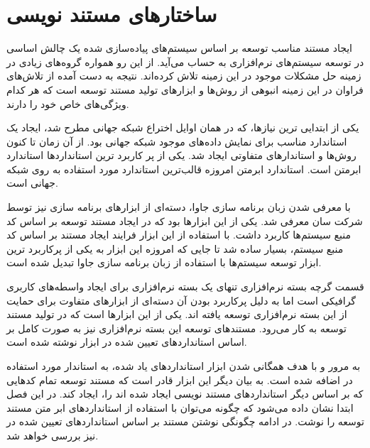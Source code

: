 
\chapter{ساختارهای مستند نویسی}

ایجاد مستند مناسب توسعه بر اساس سیستم‌های پیاده‌سازی شده یک چالش اساسی در توسعه
سیستم‌های نرم‌افزاری به حساب می‌آید. از این رو همواره گروه‌های زیادی در زمینه حل
مشکلات موجود در این زمینه تلاش کرده‌اند. نتیجه به دست آمده از تلاش‌های فراوان در
این زمینه انبوهی از روش‌ها و ابزارهای تولید مستند توسعه است که هر کدام ویژگی‌های
خاص خود را دارند.

   یکی از ابتدایی ترین نیازها، که در همان اوایل اختراع شبکه جهانی مطرح شد، ایجاد
یک استاندارد
   مناسب برای نمایش داده‌های موجود شبکه جهانی بود. از آن زمان تا کنون روش‌ها و
استاندارهای
   متفاوتی ایجاد شد. یکی از پر کاربرد ترین استانداردها استاندارد ابرمتن
 است. استاندارد
   ابرمتن امروزه قالب‌ترین استاندارد مورد استفاده به روی شبکه جهانی است.

   با معرفی شدن زبان برنامه سازی جاوا، دسته‌ای از ابزارهای برنامه سازی نیز توسط
شرکت
   سان معرفی شد.  یکی از این ابزارها
   بود که
   در ایجاد مستند توسعه بر اساس کد منبع سیستم‌ها کاربرد داشت. با استفاده از این
ابزار فرایند
   ایجاد مستند بر اساس کد منبع سیستم، بسیار ساده شد تا جایی که امروزه این ابزار
به یکی از
   پرکاربرد ترین ابزار توسعه سیستم‌ها با استفاده از زبان برنامه سازی جاوا تبدیل
شده است.

قسمت
   گرچه بسته نرم‌افزاری  تنهای یک بسته نرم‌افزاری برای ایجاد واسطه‌های
کاربری گرافیکی
   است اما به دلیل پرکاربرد بودن آن دسته‌ای از ابزارهای متفاوت برای حمایت از این
بسته نرم‌افزاری
   توسعه یافته اند.  یکی از این ابزارها است که در تولید مستند توسعه
به کار می‌رود.
   مستندهای توسعه این بسته نرم‌افزاری نیز به صورت کامل بر اساس استانداردهای
تعیین شده در
   ابزار  نوشته شده است.

    به مرور  و با هدف همگانی شدن ابزار  استانداردهای یاد شده، به
استاندار مورد استفاده
    در   اضافه شده است. به بیان دیگر این ابزار قادر است که مستند
توسعه تمام کدهایی
    که بر اساس دیگر استانداردهای مستند نویسی ایجاد شده اند را، ایجاد کند. در این
فصل ابتدا نشان
    داده می‌شود که چگونه می‌توان با استفاده از استانداردهای ابر متن مستند توسعه
را نوشت. در ادامه
    چگونگی نوشتن مستند بر اساس استانداردهای تعیین شده در  نیز بررسی
خواهد شد.



 
